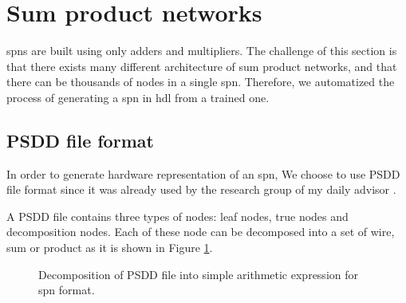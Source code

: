 \section{Sum product networks}

\Glspl{spn} are built using only adders and multipliers. The challenge of this section is that there exists many different architecture of sum product networks, and that there can be thousands of nodes in a single \gls{spn}. Therefore, we automatized the process of generating a \gls{spn} in \gls{hdl} from a trained one.

\subsection{PSDD file format}
 In order to generate hardware representation of an \gls{spn}, We choose to use PSDD file format since it was already used by the research group of my daily advisor .

A PSDD file contains three types of nodes: leaf nodes, true nodes and decomposition nodes. Each of these node can be decomposed into a set of wire, sum or product as it is shown in Figure \ref{fig:psdd2spn}. 

\begin{figure}[!ht]
\begin{mdframed}
  \centering
   \hspace{0.5cm}
   \hspace{0.5cm}
  \caption{Decomposition of PSDD file into simple arithmetic expression for \gls{spn} format.}
  \label{fig:psdd2spn}
\end{mdframed}
\end{figure}


